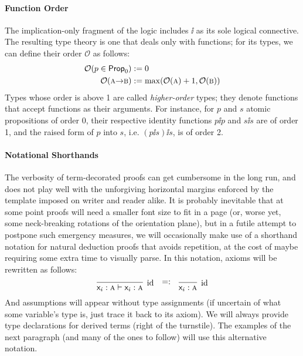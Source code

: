 \paragraph{Function Order} The implication-only fragment of the logic includes $\ii$ as its sole logical connective.
The resulting type theory is one that deals only with functions; for its types, we can define their order $\mathcal{O}$ as follows:
\begin{equation}
	\begin{aligned}
	\mathcal{O}(p \in \propcon{}) & := 0 \\
	\mathcal{O}(\prop{a} \ii \prop{b}) & := \mathrm{max}(\mathcal{O}(\prop{a}) + 1, \mathcal{O}(\prop{b}))
	\end{aligned}
\end{equation}
Types whose order is above 1 are called \textit{higher-order} types; they denote functions that accept functions as their arguments.
For instance, for $p$ and $s$ atomic propositions of order 0, their respective identity functions $p\ii p$ and $s\ii s$ are of order 1, and the raised form of $p$ into $s$, i.e. $(p\ii s)\ii s$, is of order 2.

\paragraph{Notational Shorthands}
The verbosity of term-decorated proofs can get cumbersome in the long run, and does not play well with the unforgiving horizontal margins enforced by the template imposed on writer and reader alike.
It is probably inevitable that at some point proofs will need a smaller font size to fit in a page (or, worse yet, some neck-breaking rotations of the orientation plane), but in a futile attempt to postpone such emergency measures, we will occasionally make use of a shorthand notation for natural deduction proofs that avoids repetition, at the cost of maybe requiring some extra time to visually parse.
In this notation, axioms will be rewritten as follows:
\[
\infer[\Ax]{\term{\vari }: \prop{a} \vdash \term{\vari }: \prop{a}}{} \quad \raisebox{7pt}{$=:$} \quad \infer[\Ax]{\term{\vari }:\prop{a}}{}
\]
And assumptions will appear without type assignments (if uncertain of what some variable's type is, just trace it back to its axiom). 
We will always provide type declarations for derived terms (right of the turnstile).
The examples of the next paragraph (and many of the ones to follow) will use this alternative notation.

